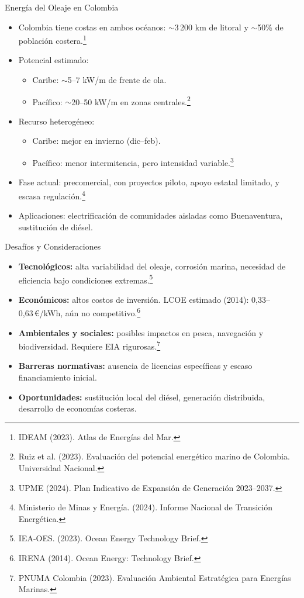 \documentclass[main.tex]{subfiles}
\begin{document}
\begin{frame}{Energía del Oleaje en Colombia}
    \small
    \begin{itemize}
        \item Colombia tiene costas en ambos océanos: $\sim$3\,200 km de litoral y $\sim$50\% de población costera.\footnote{IDEAM (2023). Atlas de Energías del Mar.}
        \item Potencial estimado:
        \begin{itemize}
            \item Caribe: $\sim$5–7 kW/m de frente de ola.
            \item Pacífico: $\sim$20–50 kW/m en zonas centrales.\footnote{Ruiz et al. (2023). Evaluación del potencial energético marino de Colombia. Universidad Nacional.}
        \end{itemize}
        \item Recurso heterogéneo:
        \begin{itemize}
            \item Caribe: mejor en invierno (dic–feb).
            \item Pacífico: menor intermitencia, pero intensidad variable.\footnote{UPME (2024). Plan Indicativo de Expansión de Generación 2023–2037.}
        \end{itemize}
        \item Fase actual: precomercial, con proyectos piloto, apoyo estatal limitado, y escasa regulación.\footnote{Ministerio de Minas y Energía. (2024). Informe Nacional de Transición Energética.}
        \item Aplicaciones: electrificación de comunidades aisladas como Buenaventura, sustitución de diésel.
    \end{itemize}
\end{frame}


\begin{frame}{Desafíos y Consideraciones}
    \small
    \begin{itemize}
        \item \textbf{Tecnológicos:} alta variabilidad del oleaje, corrosión marina, necesidad de eficiencia bajo condiciones extremas.\footnote{IEA-OES. (2023). Ocean Energy Technology Brief.}
        \item \textbf{Económicos:} altos costos de inversión. LCOE estimado (2014): 0,33–0,63 €/kWh, aún no competitivo.\footnote{IRENA (2014). Ocean Energy: Technology Brief.}
        \item \textbf{Ambientales y sociales:} posibles impactos en pesca, navegación y biodiversidad. Requiere EIA rigurosas.\footnote{PNUMA Colombia (2023). Evaluación Ambiental Estratégica para Energías Marinas.}
        \item \textbf{Barreras normativas:} ausencia de licencias específicas y escaso financiamiento inicial.
        \item \textbf{Oportunidades:} sustitución local del diésel, generación distribuida, desarrollo de economías costeras.
    \end{itemize}
\end{frame}
\end{document}
